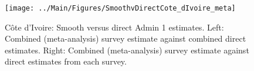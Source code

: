 \documentclass[12pt]{article}\usepackage[]{graphicx}\usepackage[]{color}
\newenvironment{knitrout}{}{} %
\begin{document}

\begin{knitrout}
\color{fgcolor}\begin{figure}[bht]

{\centering \texttt{[image: ../Main/Figures/SmoothvDirectCote\_dIvoire\_meta]} 

}

\caption[C\^{o}te d'Ivoire]{C\^{o}te d'Ivoire: Smooth versus direct Admin 1 estimates. Left: Combined (meta-analysis) survey estimate against combined direct estimates. Right: Combined (meta-analysis) survey estimate against direct estimates from each survey.}\label{fig:unnamed-chunk-83}
\end{figure}


\end{knitrout}
\end{document}

